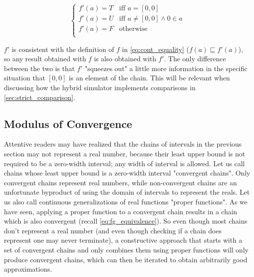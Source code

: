 \begin{equation}
  \label{eq:disc_equality}
  \begin{cases}
    f'(a) = T & \text{iff } a = [0, 0] \\
    f'(a) = U & \text{iff } a \neq [0, 0] \wedge 0 \in a \\
    f'(a) = F & \text{otherwise} \\
  \end{cases}
\end{equation}

$f'$ is consistent with the definition of $f$ in \cref{eq:cont_equality} ($f(a) \sqsubseteq f'(a)$), so any result obtained with $f$ is also obtained with $f'$. The only difference between the two is that $f'$ "squeezes out" a little more information in the specific situation that $[0,0]$ is an element of the chain. This will be relevant when discussing how the hybrid simulator implements comparisons in \cref{sec:strict_comparison}.

\subsection{Modulus of Convergence}
\label{sec:modulus}

Attentive readers may have realized that the chains of intervals in the previous section may not represent a real number, because their least upper bound is not required to be a zero-width interval; any width of interval is allowed. Let us call chains whose least upper bound is a zero-width interval "convergent chains". Only convergent chains represent real numbers, while non-convergent chains are an unfortunate byproduct of using the domain of intervals to represent the reals. Let us also call continuous generalizations of real functions "proper functions". As we have seen, applying a proper function to a convergent chain results in a chain which is also convergent (recall \cref{eq:fg_equivalence}). So even though most chains don't represent a real number (and even though checking if a chain does represent one may never terminate), a constructive approach that starts with a set of convergent chains and only combines them using proper functions will only produce convergent chains, which can then be iterated to obtain arbitrarily good approximations.

